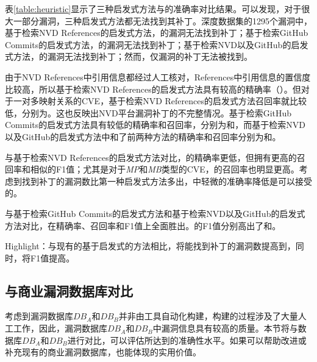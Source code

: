 表\ref{table:heuristic}显示了三种启发式方法与\tool 的准确率对比结果。可以发现，对于很大一部分漏洞，三种启发式方法都无法找到其补丁。深度数据集的1295个漏洞中，基于检索NVD References的启发式方法，的漏洞无法找到补丁；基于检索GitHub Commits的启发式方法，的漏洞无法找到补丁；基于检索NVD以及GitHub的启发式方法，的漏洞无法找到补丁；然而，仅漏洞的补丁无法被\tool 找到。

由于NVD References中引用信息都经过人工核对，References中引用信息的置信度比较高，所以基于检索NVD References的启发式方法具有较高的精确率（）。但对于一对多映射关系的CVE，基于检索NVD References的启发式方法召回率就比较低，分别为。这也反映出NVD平台漏洞补丁的不完整情况。基于检索GitHub Commits的启发式方法具有较低的精确率和召回率，分别为和，而基于检索NVD以及GitHub的启发式方法中和了前两种方法的精确率和召回率分别为和。

与基于检索NVD References的启发式方法对比，\tool 的精确率更低，但拥有更高的召回率和相似的F1值；尤其是对于\textit{MP}和\textit{MB}类型的CVE，\tool 的召回率也明显更高。考虑到\tool 找到补丁的漏洞数比第一种启发式方法多出，\tool 中轻微的准确率降低是可以接受的。

与基于检索GitHub Commits的启发式方法和基于检索NVD以及GitHub的启发式方法对比，\tool 在精确率、召回率和F1值上全面胜出。\tool 的F1值分别高出了和。

\begin{tcolorbox}[size=title,opacityfill=0.15]
Highlight：与现有的基于启发式的方法相比，\tool 将能找到补丁的漏洞数提高到，同时，将F1值提高。
\end{tcolorbox}


\subsection{与商业漏洞数据库对比}

考虑到漏洞数据库$DB_A$和$DB_B$并非由工具自动化构建，构建的过程涉及了大量人工工作，因此，漏洞数据库$DB_A$和$DB_B$中漏洞信息具有较高的质量。本节将\tool 与数据库$DB_A$和$DB_B$进行对比，可以评估\tool 所达到的准确性水平。如果\tool 可以帮助改进或补充现有的商业漏洞数据库，也能体现\tool 的实用价值。

